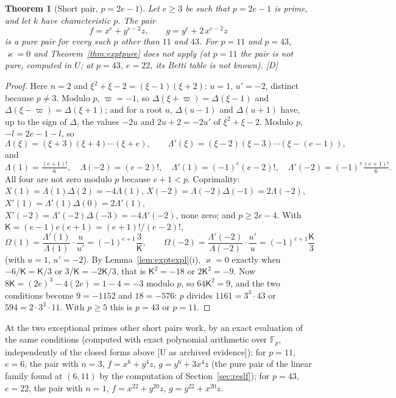 \documentclass[11pt]{article}
\newtheorem{thmletter}{Theorem}
\theoremstyle{definition}
\theoremstyle{remark}
\newcommand{\F}{\mathbb{F}}
\begin{document}
\begin{thmletter}[Short pair, $p=2e-1$]\label{thm:exptexplA}
Let $e\ge3$ be such that $p=2e-1$ is prime, and let $k$ have characteristic $p$. The pair
\[
f=x^e+y^{e-2}z,\qquad g=y^e+2\,x^{e-2}z
\]
is a pure pair for every such $p$ other than $11$ and $43$. For $p=11$ and $p=43$, $\varkappa=0$ and Theorem~\ref{thm:exptpure} does not apply (at $p=11$ the pair is not pure, computed in $U$; at $p=43$, $e=22$, its Betti table is not known). [D]
\end{thmletter}
\begin{proof}
Here $n=2$ and $\xi^2+\xi-2=(\xi-1)(\xi+2)$: $u=1$, $u'=-2$, distinct because $p\ne3$. Modulo $p$, $\varpi=-1$, so $\Delta(\xi+\varpi)=\Delta(\xi-1)$ and $\Delta(\xi-\varpi)=\Delta(\xi+1)$; and for a root $u$, $\Delta(u-1)$ and $\Delta(u+1)$ have, up to the sign of $\Delta$, the values $-2u$ and $2u+2=-2u'$ of $\xi^2+\xi-2$. Modulo $p$, $-l=2e-1-l$, so
\[
\Lambda(\xi)=(\xi+3)(\xi+4)\cdots(\xi+e),\qquad\Lambda'(\xi)=(\xi-2)(\xi-3)\cdots(\xi-(e-1)),
\]
and
\[
\Lambda(1)=\tfrac{(e+1)!}6,\quad\Lambda(-2)=(e-2)!,\quad\Lambda'(1)=(-1)^e(e-2)!,\quad\Lambda'(-2)=(-1)^e\tfrac{(e+1)!}6.
\]
All four are not zero modulo $p$ because $e+1<p$. Coprimality: $X(1)=\Lambda(1)\Delta(2)=-4\Lambda(1)$, $X(-2)=\Lambda(-2)\Delta(-1)=2\Lambda(-2)$, $X'(1)=\Lambda'(1)\Delta(0)=2\Lambda'(1)$, $X'(-2)=\Lambda'(-2)\Delta(-3)=-4\Lambda'(-2)$, none zero; and $p\ge2e-4$. With $\mathsf K=(e-1)e(e+1)=(e+1)!/(e-2)!$,
\[
\Omega(1)=\frac{\Lambda'(1)}{\Lambda(1)}\cdot\frac{u}{u'}=(-1)^{e+1}\frac3{\mathsf K},\qquad\Omega(-2)=\frac{\Lambda'(-2)}{\Lambda(-2)}\cdot\frac{u'}{u}=(-1)^{e+1}\frac{\mathsf K}3
\]
(with $u=1$, $u'=-2$). By Lemma~\ref{lem:exptexpl}(i), $\varkappa=0$ exactly when $-6/\mathsf K=\mathsf K/3$ or $3/\mathsf K=-2\mathsf K/3$, that is $\mathsf K^2=-18$ or $2\mathsf K^2=-9$. Now $8\mathsf K=(2e)^3-4(2e)=1-4=-3$ modulo $p$, so $64\mathsf K^2=9$, and the two conditions become $9=-1152$ and $18=-576$: $p$ divides $1161=3^3\cdot43$ or $594=2\cdot3^3\cdot11$. With $p\ge5$ this is $p=43$ or $p=11$.
\end{proof}

At the two exceptional primes other short pairs work, by an exact evaluation of the same conditions (computed with exact polynomial arithmetic over $\F_p$, independently of the closed forms above [U as archived evidence]): for $p=11$, $e=6$, the pair with $n=3$, $f=x^6+y^4z$, $g=y^6+3x^4z$ (the pure pair of the linear family found at $(6,11)$ by the computation of Section~\ref{sec:reslf}); for $p=43$, $e=22$, the pair with $n=1$, $f=x^{22}+y^{20}z$, $g=y^{22}+x^{20}z$.
\end{document}
